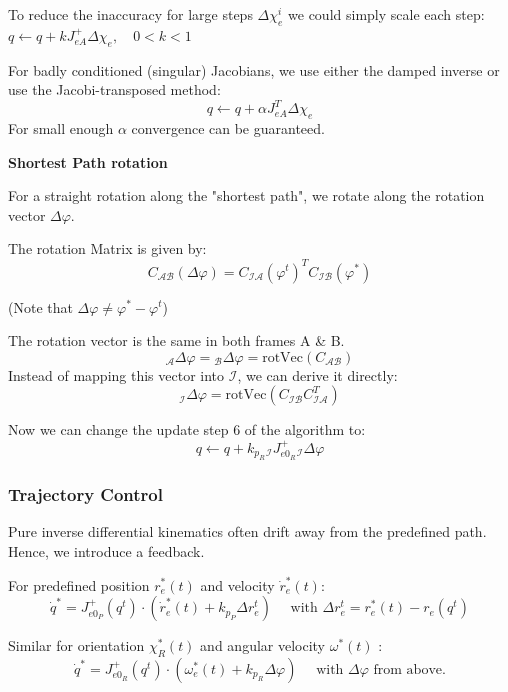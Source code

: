 \documentclass[fontsize=6pt,DIV=calc,a4paper,ngerman]{scrartcl}
\begin{document}
\begin{multicols*}{4}
	To reduce the inaccuracy for large steps $\Delta\chi_e^i$ we could simply scale each step:
	$q \leftarrow q+ kJ_{eA}^+ \Delta\chi_e ,\quad 0<k<1$

	\smallskip
	For badly conditioned (singular) Jacobians, we use either the damped inverse or use the Jacobi-transposed method:
	$$q \leftarrow q+ \alpha J_{eA}^T \Delta\chi_e$$
	For small enough $\alpha$ convergence can be guaranteed.

	\smallskip
	\textbf{Shortest Path rotation}

	For a straight rotation along the "shortest path", we rotate along the rotation vector $\Delta \varphi$.

	The rotation Matrix is given by: $$C_\mathcal{AB}(\Delta\varphi)=C_\mathcal{IA}(\varphi^t)^TC_\mathcal{IB}(\varphi^*)$$
	\begin{flushright}(Note that $\Delta\varphi \neq \varphi^*-\varphi^t$)\end{flushright}
	The rotation vector is the same in both frames A \& B. $${}_\mathcal{A}\Delta\varphi = {}_\mathcal{B}\Delta\varphi = \text{rotVec}(C_\mathcal{AB})$$
	Instead of mapping this vector into $\mathcal{I}$, we can derive it directly:
	$${}_\mathcal{I}\Delta\varphi = \text{rotVec}(C_\mathcal{IB}C_\mathcal{IA}^T)$$

	Now we can change the update step 6 of the algorithm to:
	$$q \leftarrow q + k_{p_R}{}_\mathcal{I}J^+_{e0_R}{}_\mathcal{I}\Delta\varphi$$


	\subsubsection{Trajectory Control}
	Pure inverse differential kinematics often drift away from the predefined path. Hence, we introduce a feedback.

	For predefined position $r_e^*(t)$ and velocity $\dot{r}_e^*(t)$:
	$$\dot{q}^*= J_{e0_P}^+(q^t)\cdot (\dot{r}_e^*(t) + k_{p_P}\Delta r^t_e) \quad \text{ with } \Delta r^t_e = r^*_e(t) -r_e(q^t)$$

	Similar for orientation $\chi_R^*(t)$ and angular velocity $\omega^*(t)$ :
	$$\dot{q}^*= J_{e0_R}^+(q^t)\cdot (\omega_e^*(t) + k_{p_R}\Delta\varphi) \quad \text{ with } \Delta\varphi \text{ from above.}$$



\end{multicols*}
\end{document}
